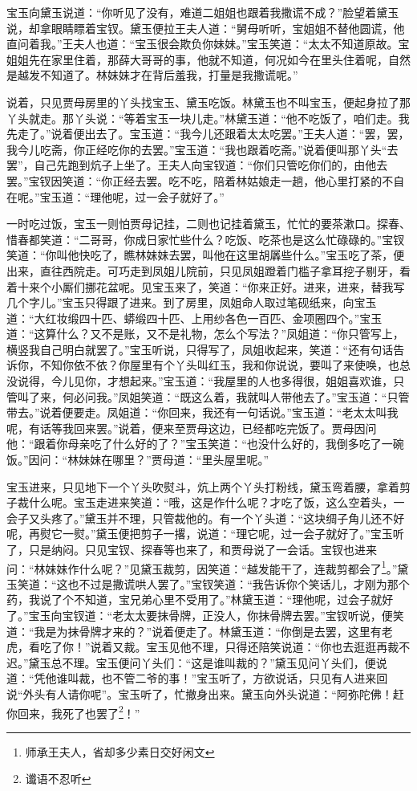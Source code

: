 \documentclass[12pt,oneside]{book}
\begin{document}
宝玉向黛玉说道：“你听见了没有，难道二姐姐也跟着我撒谎不成？”脸望着黛玉说，却拿眼睛瞟着宝钗。黛玉便拉王夫人道：“舅母听听，宝姐姐不替他圆谎，他直问着我。”王夫人也道：“宝玉很会欺负你妹妹。”宝玉笑道：“太太不知道原故。宝姐姐先在家里住着，那薛大哥哥的事，他就不知道，何况如今在里头住着呢，自然是越发不知道了。林妹妹才在背后羞我，打量是我撒谎呢。”

说着，只见贾母房里的丫头找宝玉、黛玉吃饭。林黛玉也不叫宝玉，便起身拉了那丫头就走。那丫头说：“等着宝玉一块儿走。”林黛玉道：“他不吃饭了，咱们走。我先走了。”说着便出去了。宝玉道：“我今儿还跟着太太吃罢。”王夫人道：“罢，罢，我今儿吃斋，你正经吃你的去罢。”宝玉道：“我也跟着吃斋。”说着便叫那丫头“去罢”，自己先跑到炕子上坐了。王夫人向宝钗道：“你们只管吃你们的，由他去罢。”宝钗因笑道：“你正经去罢。吃不吃，陪着林姑娘走一趟，他心里打紧的不自在呢。”宝玉道：“理他呢，过一会子就好了。”

一时吃过饭，宝玉一则怕贾母记挂，二则也记挂着黛玉，忙忙的要茶漱口。探春、惜春都笑道：“二哥哥，你成日家忙些什么？吃饭、吃茶也是这么忙碌碌的。”宝钗笑道：“你叫他快吃了，瞧林妹妹去罢，叫他在这里胡羼些什么。”宝玉吃了茶，便出来，直往西院走。可巧走到凤姐儿院前，只见凤姐蹬着门槛子拿耳挖子剔牙，看着十来个小厮们挪花盆呢。见宝玉来了，笑道：“你来正好。进来，进来，替我写几个字儿。”宝玉只得跟了进来。到了房里，凤姐命人取过笔砚纸来，向宝玉道：“大红妆缎四十匹、蟒缎四十匹、上用纱各色一百匹、金项圈四个。”宝玉道：“这算什么？又不是账，又不是礼物，怎么个写法？”凤姐道：“你只管写上，横竖我自己明白就罢了。”宝玉听说，只得写了，凤姐收起来，笑道：“还有句话告诉你，不知你依不依？你屋里有个丫头叫红玉，我和你说说，要叫了来使唤，也总没说得，今儿见你，才想起来。”宝玉道：“我屋里的人也多得很，姐姐喜欢谁，只管叫了来，何必问我。”凤姐笑道：“既这么着，我就叫人带他去了。”宝玉道：“只管带去。”说着便要走。凤姐道：“你回来，我还有一句话说。”宝玉道：“老太太叫我呢，有话等我回来罢。”说着，便来至贾母这边，已经都吃完饭了。贾母因问他：“跟着你母亲吃了什么好的了？”宝玉笑道：“也没什么好的，我倒多吃了一碗饭。”因问：“林妹妹在哪里？”贾母道：“里头屋里呢。”

宝玉进来，只见地下一个丫头吹熨斗，炕上两个丫头打粉线，黛玉弯着腰，拿着剪子裁什么呢。宝玉走进来笑道：“哦，这是作什么呢？才吃了饭，这么空着头，一会子又头疼了。”黛玉并不理，只管裁他的。有一个丫头道：“这块绸子角儿还不好呢，再熨它一熨。”黛玉便把剪子一撂，说道：“理它呢，过一会子就好了。”宝玉听了，只是纳闷。只见宝钗、探春等也来了，和贾母说了一会话。宝钗也进来问：“林妹妹作什么呢？”见黛玉裁剪，因笑道：“越发能干了，连裁剪都会了\footnote{师承王夫人，省却多少素日交好闲文}。”黛玉笑道：“这也不过是撒谎哄人罢了。”宝钗笑道：“我告诉你个笑话儿，才刚为那个药，我说了个不知道，宝兄弟心里不受用了。”林黛玉道：“理他呢，过会子就好了。”宝玉向宝钗道：“老太太要抹骨牌，正没人，你抹骨牌去罢。”宝钗听说，便笑道：“我是为抹骨牌才来的？”说着便走了。林黛玉道：“你倒是去罢，这里有老虎，看吃了你！”说着又裁。宝玉见他不理，只得还陪笑说道：“你也去逛逛再裁不迟。”黛玉总不理。宝玉便问丫头们：“这是谁叫裁的？”黛玉见问丫头们，便说道：“凭他谁叫裁，也不管二爷的事！”宝玉听了，方欲说话，只见有人进来回说“外头有人请你呢”。宝玉听了，忙撤身出来。黛玉向外头说道：“阿弥陀佛！赶你回来，我死了也罢了\footnote{谶语不忍听}！”
\end{document}
